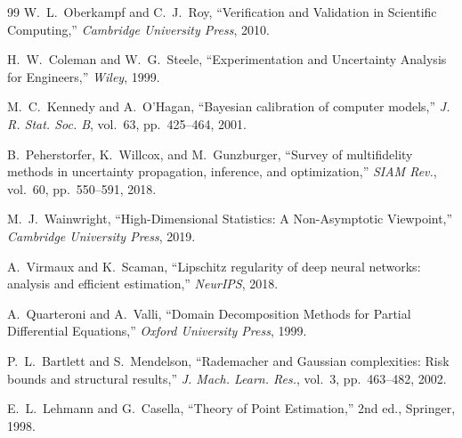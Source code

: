 \documentclass[11pt,a4paper]{article}
\theoremstyle{definition}
\begin{document}
\begin{thebibliography}{99}
W.~L.~Oberkampf and C.~J.~Roy, ``Verification and Validation in Scientific Computing,'' \textit{Cambridge University Press}, 2010.

H.~W.~Coleman and W.~G.~Steele, ``Experimentation and Uncertainty Analysis for Engineers,'' \textit{Wiley}, 1999.

M.~C.~Kennedy and A.~O'Hagan, ``Bayesian calibration of computer models,'' \textit{J. R. Stat. Soc. B}, vol.~63, pp.~425--464, 2001.

B.~Peherstorfer, K.~Willcox, and M.~Gunzburger, ``Survey of multifidelity methods in uncertainty propagation, inference, and optimization,'' \textit{SIAM Rev.}, vol.~60, pp.~550--591, 2018.

M.~J.~Wainwright, ``High-Dimensional Statistics: A Non-Asymptotic Viewpoint,'' \textit{Cambridge University Press}, 2019.

A.~Virmaux and K.~Scaman, ``Lipschitz regularity of deep neural networks: analysis and efficient estimation,'' \textit{NeurIPS}, 2018.

A.~Quarteroni and A.~Valli, ``Domain Decomposition Methods for Partial Differential Equations,'' \textit{Oxford University Press}, 1999.

P.~L.~Bartlett and S.~Mendelson, ``Rademacher and Gaussian complexities: Risk bounds and structural results,'' \textit{J. Mach. Learn. Res.}, vol.~3, pp.~463--482, 2002.

E.~L.~Lehmann and G.~Casella, ``Theory of Point Estimation,'' 2nd ed., Springer, 1998.

\end{thebibliography}
\end{document}
